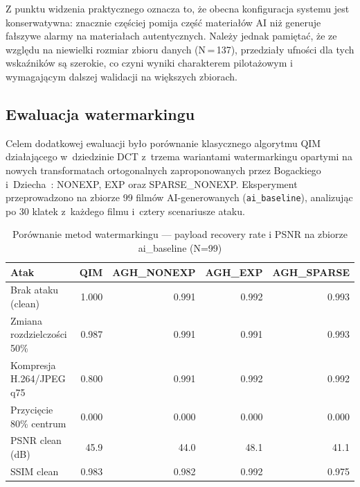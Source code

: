 Z punktu widzenia praktycznego oznacza to, że obecna konfiguracja systemu
jest konserwatywna: znacznie częściej pomija część materiałów AI
niż generuje fałszywe alarmy na materiałach autentycznych.
Należy jednak pamiętać, że ze względu na niewielki rozmiar zbioru danych (N\,=\,137),
przedziały ufności dla tych wskaźników są szerokie, co czyni wyniki charakterem
pilotażowym i wymagającym dalszej walidacji na większych zbiorach.

\subsection{Ewaluacja watermarkingu}
\label{sec:watermark_eval}

Celem dodatkowej ewaluacji było porównanie klasycznego algorytmu QIM
działającego w~dziedzinie DCT z~trzema wariantami watermarkingu opartymi
na nowych transformatach ortogonalnych zaproponowanych przez Bogackiego
i~Dziecha~\cite{bogacki2022analysis}: NONEXP, EXP oraz SPARSE\_NONEXP.
Eksperyment przeprowadzono na zbiorze 99 filmów AI-generowanych
(\texttt{ai\_baseline}), analizując po 30 klatek z~każdego filmu
i~cztery scenariusze ataku.

\begin{table}[ht]
\centering
\caption{Porównanie metod watermarkingu --- payload recovery rate i PSNR na zbiorze ai\_baseline (N=99)}
\label{tab:watermark_comparison}
\begin{tabular}{lrrrr}
\toprule
Atak & QIM & AGH\_NONEXP & AGH\_EXP & AGH\_SPARSE \\
\midrule
Brak ataku (clean) & \num{1.000} & \num{0.991} & \num{0.992} & \num{0.993} \\
Zmiana rozdzielczości 50\% & \num{0.987} & \num{0.991} & \num{0.991} & \num{0.993} \\
Kompresja H.264/JPEG q75 & \num{0.800} & \num{0.991} & \num{0.992} & \num{0.992} \\
Przycięcie 80\% centrum & \num{0.000} & \num{0.000} & \num{0.000} & \num{0.000} \\
PSNR clean (dB) & \num{45.9} & \num{44.0} & \num{48.1} & \num{41.1} \\
SSIM clean & \num{0.983} & \num{0.982} & \num{0.992} & \num{0.975} \\
\bottomrule
\end{tabular}
\end{table}


